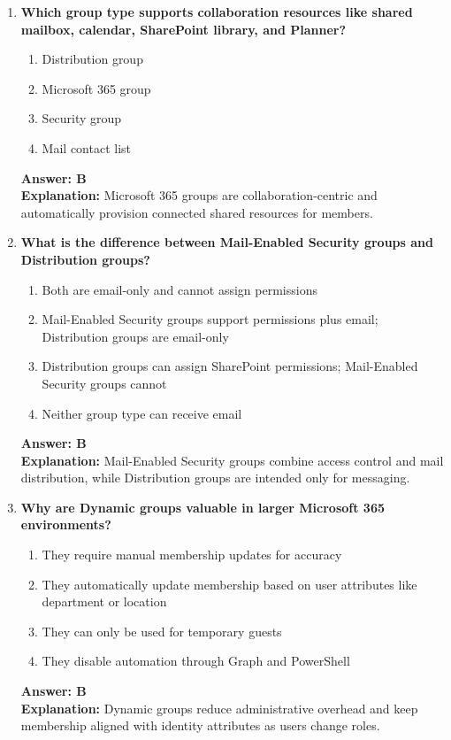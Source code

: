 \documentclass[10pt]{article}
\begin{document}
\begin{enumerate}[leftmargin=*]
\item \textbf{Which group type supports collaboration resources like shared mailbox, calendar, SharePoint library, and Planner?}
\begin{enumerate}[label=\Alph*.]
  \item Distribution group
  \item Microsoft 365 group
  \item Security group
  \item Mail contact list
\end{enumerate}
\textbf{Answer: B}\\
\textbf{Explanation:} Microsoft 365 groups are collaboration-centric and automatically provision connected shared resources for members.

\item \textbf{What is the difference between Mail-Enabled Security groups and Distribution groups?}
\begin{enumerate}[label=\Alph*.]
  \item Both are email-only and cannot assign permissions
  \item Mail-Enabled Security groups support permissions plus email; Distribution groups are email-only
  \item Distribution groups can assign SharePoint permissions; Mail-Enabled Security groups cannot
  \item Neither group type can receive email
\end{enumerate}
\textbf{Answer: B}\\
\textbf{Explanation:} Mail-Enabled Security groups combine access control and mail distribution, while Distribution groups are intended only for messaging.

\item \textbf{Why are Dynamic groups valuable in larger Microsoft 365 environments?}
\begin{enumerate}[label=\Alph*.]
  \item They require manual membership updates for accuracy
  \item They automatically update membership based on user attributes like department or location
  \item They can only be used for temporary guests
  \item They disable automation through Graph and PowerShell
\end{enumerate}
\textbf{Answer: B}\\
\textbf{Explanation:} Dynamic groups reduce administrative overhead and keep membership aligned with identity attributes as users change roles.

\end{enumerate}
\clearpage
\end{document}

